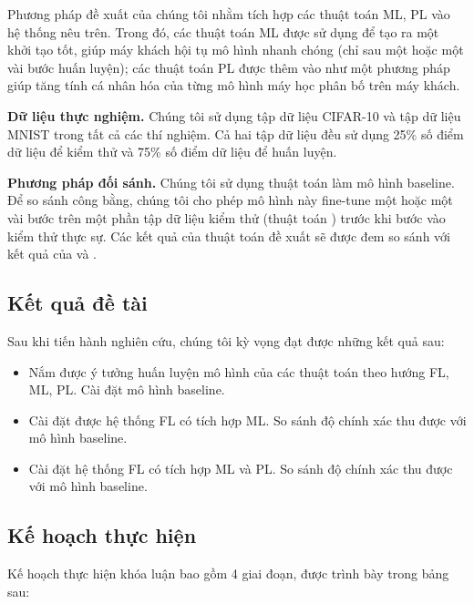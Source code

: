 Phương pháp đề xuất của chúng tôi nhằm tích hợp các thuật toán ML, PL vào hệ thống nêu trên. Trong đó, các thuật toán ML được sử dụng để tạo ra một khởi tạo tốt, giúp máy khách hội tụ mô hình nhanh chóng (chỉ sau một hoặc một vài bước huấn luyện); các thuật toán PL được thêm vào như một phương pháp giúp tăng tính cá nhân hóa của từng mô hình máy học phân bố trên máy khách.

\textbf{Dữ liệu thực nghiệm.} Chúng tôi sử dụng tập dữ liệu CIFAR-10 và tập dữ liệu MNIST trong tất cả các thí nghiệm. Cả hai tập dữ liệu đều sử dụng 25\% số điểm dữ liệu để kiểm thử và 75\% số điểm dữ liệu để huấn luyện.

\textbf{Phương pháp đối sánh.} Chúng tôi sử dụng thuật toán  làm mô hình baseline. Để so sánh công bằng, chúng tôi cho phép mô hình này fine-tune một hoặc một vài bước trên một phần tập dữ liệu kiểm thử (thuật toán ) trước khi bước vào kiểm thử thực sự. Các kết quả của thuật toán đề xuất sẽ được đem so sánh với kết quả của  và .

\subsection*{Kết quả đề tài}

Sau khi tiến hành nghiên cứu, chúng tôi kỳ vọng đạt được những kết quả sau:

\begin{itemize}
    \item Nắm được ý tưởng huấn luyện mô hình của các thuật toán theo hướng FL, ML, PL. Cài đặt mô hình baseline.
    \item Cài đặt được hệ thống FL có tích hợp ML. So sánh độ chính xác thu được với mô hình baseline.
    \item Cài đặt hệ thống FL có tích hợp ML và PL. So sánh độ chính xác thu được với mô hình baseline.
\end{itemize}

\subsection*{Kế hoạch thực hiện}

Kế hoạch thực hiện khóa luận bao gồm 4 giai đoạn, được trình bày trong bảng sau:

